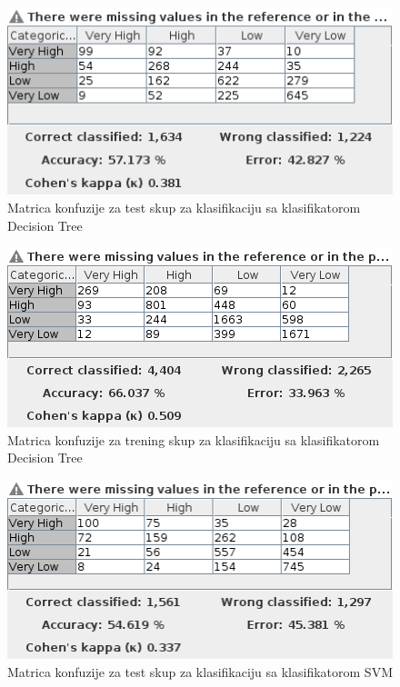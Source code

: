 \documentclass[11pt]{article} %
\begin{document}
\begin{figure}[h!]
	\centering
	\includegraphics[width=1.1\textwidth]{priceClassificationTest/DecisionTree}
	\caption{Matrica konfuzije za test skup za klasifikaciju sa klasifikatorom Decision Tree}
\end{figure}
\begin{figure}[h!]
	\centering
	\includegraphics[width=1.1\textwidth]{priceClassificationTraining/DecisionTree}
	\caption{Matrica konfuzije za trening skup za klasifikaciju sa klasifikatorom Decision Tree}
\end{figure}
\newline
\begin{figure}[h!]
	\centering
	\includegraphics[width=1.1\textwidth]{priceClassificationTest/SVM}
	\caption{Matrica konfuzije za test skup za klasifikaciju sa klasifikatorom SVM}
\end{figure}
\end{document}
